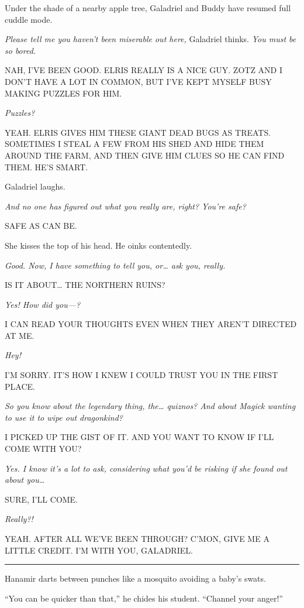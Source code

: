 \documentclass[smalldemyvopaper,11pt,twoside,onecolumn,openright,extrafontsizes]{memoir}
\begin{document}
Under the shade of a nearby apple tree, Galadriel and Buddy have resumed
full cuddle mode.

\emph{Please tell me you haven't been miserable out here,} Galadriel
thinks. \emph{You must be so bored.}

NAH, I'VE BEEN GOOD. ELRIS REALLY IS A NICE GUY. ZOTZ AND I DON'T HAVE A
LOT IN COMMON, BUT I'VE KEPT MYSELF BUSY MAKING PUZZLES FOR HIM.

\emph{Puzzles?}

YEAH. ELRIS GIVES HIM THESE GIANT DEAD BUGS AS TREATS. SOMETIMES I STEAL
A FEW FROM HIS SHED AND HIDE THEM AROUND THE FARM, AND THEN GIVE HIM
CLUES SO HE CAN FIND THEM. HE'S SMART.

Galadriel laughs.

\emph{And no one has figured out what you really are, right? You're
safe?}

SAFE AS CAN BE.

She kisses the top of his head. He oinks contentedly.

\emph{Good. Now, I have something to tell you, or\ldots{} ask you,
really.}

IS IT ABOUT\ldots{} THE NORTHERN RUINS?

\emph{Yes! How did you---?}

I CAN READ YOUR THOUGHTS EVEN WHEN THEY AREN'T DIRECTED AT ME.

\emph{Hey!}

I'M SORRY. IT'S HOW I KNEW I COULD TRUST YOU IN THE FIRST PLACE.

\emph{So you know about the legendary thing, the\ldots{} quiznos? And
about Magick wanting to use it to wipe out dragonkind?}

I PICKED UP THE GIST OF IT. AND YOU WANT TO KNOW IF I'LL COME WITH YOU?

\emph{Yes. I know it's a lot to ask, considering what you'd be risking
if she found out about you\ldots{}}

SURE, I'LL COME.

\emph{Really?!}

YEAH. AFTER ALL WE'VE BEEN THROUGH? C'MON, GIVE ME A LITTLE CREDIT. I'M
WITH YOU, GALADRIEL.

\begin{center}\rule{0.5\linewidth}{\linethickness}\end{center}

Hanamir darts between punches like a mosquito avoiding a baby's swats.

``You can be quicker than that,'' he chides his student. ``Channel your
anger!''
\end{document}
